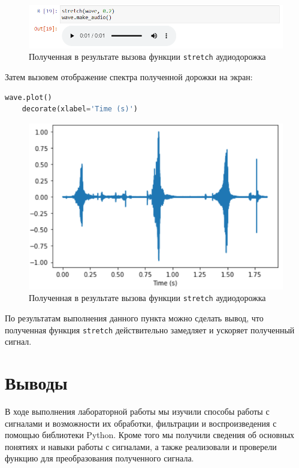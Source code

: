 \documentclass[a4paper]{article}
\begin{document}
            \begin{figure}[H]
                \centering
                \includegraphics[width=\textwidth]{stretch_audio.png}
                \caption{Полученная в результате вызова функции \texttt{stretch} аудиодорожка}
                \label{fig:stretch_audio}
            \end{figure}
            
            Затем вызовем отображение спектра полученной дорожки на экран:
            
\begin{lstlisting}[language=Python, caption= Вывод на экран полученной после вызова функции \texttt{stretch} аудиодорожки]
    wave.plot()
    decorate(xlabel='Time (s)')
\end{lstlisting}
            
            \begin{figure}[H]
                \centering
                \includegraphics[width=\textwidth]{stretch_audio_result.png}
                \caption{Полученная в результате вызова функции \texttt{stretch} аудиодорожка}
                \label{fig:stretch_audio_result}
            \end{figure}
            
            По результатам выполнения данного пункта можно сделать вывод, что полученная функция \texttt{stretch} действительно замедляет и ускоряет полученный сигнал.
    
    \newpage
        \section{Выводы}
            В ходе выполнения лабораторной работы мы изучили способы работы с сигналами и возможности их обработки, фильтрации и воспроизведения с помощью библиотеки Python. Кроме того мы получили сведения об основных понятиях и навыки работы с сигналами, а также реализовали и проверели функцию для преобразования полученного сигнала. 
    
\end{document}
